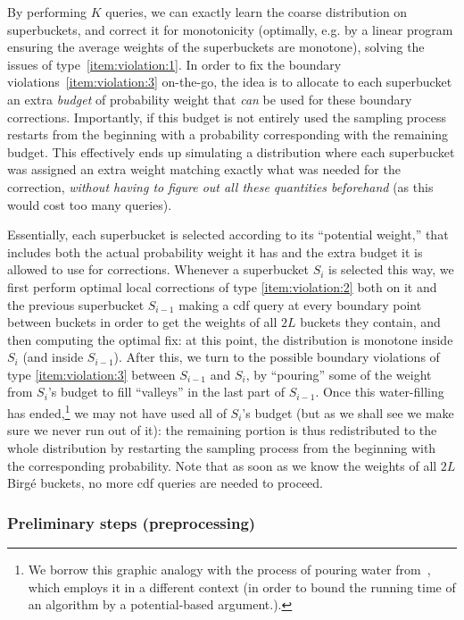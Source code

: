 By performing $K$ queries, we can exactly learn the coarse distribution on superbuckets, and correct it for monotonicity {(optimally, e.g. by a linear program ensuring the average weights of the superbuckets are monotone)}, solving the issues of type~\ref{item:violation:1}. In order to fix the boundary violations~\ref{item:violation:3} on-the-go, the idea is to allocate to each superbucket an extra \emph{budget} of probability weight that \emph{can} be used for these boundary corrections. {Importantly}, if this budget is not entirely used the sampling process restarts from the beginning with a probability corresponding with the remaining budget. This effectively ends up simulating a distribution where each superbucket was assigned an extra weight matching exactly what was needed for the correction, \emph{without having to figure out all these quantities beforehand} (as this would cost too many queries). 

Essentially, each superbucket is selected according to its ``potential weight,'' that includes both the actual probability weight it has and the extra budget it is allowed to use for corrections. Whenever a superbucket $S_i$ is selected this way, we first perform optimal local corrections of type \ref{item:violation:2} {both} on it and {the previous superbucket} $S_{i-1}$ {making a cdf query at every boundary point between buckets in order to get the} weights of all $2L$ buckets they contain, and {then} computing the optimal fix: at this point, the distribution is monotone inside $S_i$ (and inside $S_{i-1}$). After this, we turn to the possible boundary violations of type \ref{item:violation:3} between $S_{i-1}$ and $S_{i}$, by ``pouring'' some of the weight from $S_{i}$'s budget to fill ``valleys'' in the last part of $S_{i-1}$. Once this water-filling has ended,\footnote{{We borrow this graphic analogy with the process of pouring water from~\cite{ACCL:08}, which employs it in a different context (in order to bound the running time of an algorithm by a potential-based argument.).}} we may not have used all of $S_i$'s budget {(but as we shall see we make sure we never run out of it)}: the remaining portion is thus redistributed to the whole distribution by restarting the sampling process from the beginning with the corresponding probability. {Note that as soon as we know the weights of all $2L$ Birg\'e buckets, no more cdf queries are needed to proceed.} 

\subsubsection{Preliminary steps (preprocessing)}\label{sec:mon:corr:prelim}

